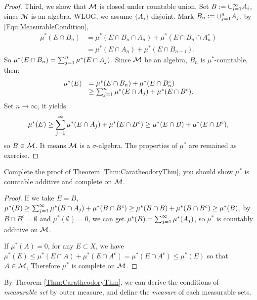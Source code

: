 \begin{proof}
    Third, we show that $\mathcal{M}$ is closed under countable union. 
    Set $B:=\cup_{i=1}^{\infty}A_{i}$, since $\mathcal{M}$ is an algebra, 
    WLOG, we assume $\{A_{j}\}$ disjoint. Mark $B_{n}:=\cup_{j=1}^{n}A_j$, 
    by \eqref{Equ:MeasurableCondition}, 
    \begin{displaymath}
        \begin{array}{rl}
        \mu^{*}(E\cap B_n)&=\mu^{*}(E\cap B_{n}\cap A_{n})+
        \mu^{*}(E\cap B_n\cap A_n^c)\\
        &=\mu^{*}(E\cap A_n)+\mu^{*}(E\cap B_{n-1}).
        \end{array}
    \end{displaymath}
    So $\mu^{*}(E\cap B_n)=\sum_{j=1}^{n}\mu^{*}(E\cap A_j)$. Since $\mathcal{M}$ 
    be an algebra, $B_{n}$ is $\mu^{*}$-countable, then:
    \begin{displaymath}
        \begin{array}{rl}
            \mu^{*}(E)&=\mu^{*}(E\cap B_n)+\mu^{*}(E\cap B_{n}^{c})\\
            &\ge\sum_{j=1}^{n}\mu^{*}(E\cap A_j)+\mu^{*}(E\cap B^c).\\
        \end{array}
    \end{displaymath}
    Set $n\rightarrow\infty$, it yields 
    \begin{displaymath}
        \mu^{*}(E)\ge\sum_{j=1}^{\infty}\mu^{*}(E\cap A_j)+\mu^{*}(E\cap B^c)
        \ge\mu^{*}(E\cap B)+\mu^{*}(E\cap B^c),
    \end{displaymath}
    so $B\in\mathcal{M}$. It means $\mathcal{M}$ is a $\sigma$-algebra. 
    The properties of $\mu^{*}$ are remained as exercise.
\end{proof}
\begin{exc}
    Complete the proof of Theorem \ref{Thm:CaratheodoryThm}, 
    you should show $\mu^{*}$ is countable additive 
    and complete on $\mathcal{M}$.
\end{exc}
\begin{proof}
    If we take $E=B$, $\mu^{*}(B)\ge\sum_{j=1}^{\infty}\mu^{*}(B\cap A_j)+\mu^{*}(B\cap B^c)
    \ge\mu^{*}(B\cap B)+\mu^{*}(B\cap B^c)\ge\mu^{*}(B)$, by $B\cap B^c=\emptyset$ and 
    $\mu^{*}(\emptyset)=0$, we can get $\mu^{*}(B)=\sum_{j=1}^{\infty}\mu^{*}(A_j)$, so 
    $\mu^{*}$ is countably additive on $\mathcal{M}$.

    If $\mu^{*}(A)=0$, for any $E\subset X$, we have $\mu^{*}(E)\leq\mu^{*}(E\cap A)+
    \mu^{*}(E\cap A^c)=\mu^{*}(E\cap A^c)\leq \mu^{*}(E)$ so that $A\in\mathcal{M}$, Therefore
    $\mu^{*}$ is complete on $\mathcal{M}$.
\end{proof}
\begin{rem}
    By Theorem \ref{Thm:CaratheodoryThm}, we can derive the conditions 
    of \textit{measurable set} by outer measure, and 
    define the \textit{measure} of each measurable sets.
\end{rem}
